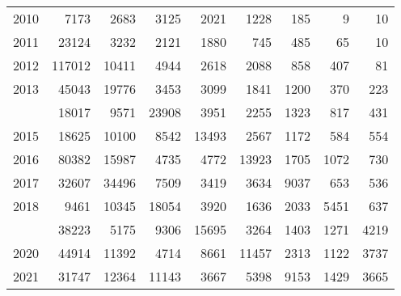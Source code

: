 \documentclass[
]{article}
\begin{document}
\begin{longtable}[t]{lrrrrrrrr}
2010 & 7173 & 2683 & 3125 & 2021 & 1228 & 185 & 9 & 10\\
2011 & 23124 & 3232 & 2121 & 1880 & 745 & 485 & 65 & 10\\
2012 & 117012 & 10411 & 4944 & 2618 & 2088 & 858 & 407 & 81\\
2013 & 45043 & 19776 & 3453 & 3099 & 1841 & 1200 & 370 & 223\\
\addlinespace
2014 & 18017 & 9571 & 23908 & 3951 & 2255 & 1323 & 817 & 431\\
2015 & 18625 & 10100 & 8542 & 13493 & 2567 & 1172 & 584 & 554\\
2016 & 80382 & 15987 & 4735 & 4772 & 13923 & 1705 & 1072 & 730\\
2017 & 32607 & 34496 & 7509 & 3419 & 3634 & 9037 & 653 & 536\\
2018 & 9461 & 10345 & 18054 & 3920 & 1636 & 2033 & 5451 & 637\\
\addlinespace
2019 & 38223 & 5175 & 9306 & 15695 & 3264 & 1403 & 1271 & 4219\\
2020 & 44914 & 11392 & 4714 & 8661 & 11457 & 2313 & 1122 & 3737\\
2021 & 31747 & 12364 & 11143 & 3667 & 5398 & 9153 & 1429 & 3665\\*
\end{longtable}
\end{document}
